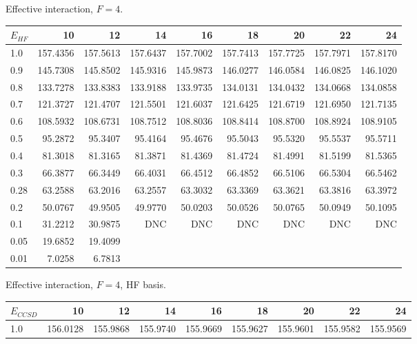 \begin{landscape}
\begin{table}
\begin{center}
Effective interaction, $F=4$.\\
\begin{tabular}{l|rrrrrrrr}
\hline 
$E_{HF}$ & 10 & 12 & 14 & 16 & 18 & 20 & 22 & 24 \\
\hline \hline
1.0 &  157.4356 & 157.5613 & 157.6437 & 157.7002 & 157.7413 & 157.7725 & 157.7971 & 157.8170 \\ 
0.9 &  145.7308 & 145.8502 & 145.9316 & 145.9873 & 146.0277 & 146.0584 & 146.0825 & 146.1020 \\ 
0.8 &  133.7278 & 133.8383 & 133.9188 & 133.9735 & 134.0131 & 134.0432 & 134.0668 & 134.0858 \\ 
0.7 &  121.3727 & 121.4707 & 121.5501 & 121.6037 & 121.6425 & 121.6719 & 121.6950 & 121.7135 \\ 
0.6 &  108.5932 & 108.6731 & 108.7512 & 108.8036 & 108.8414 & 108.8700 & 108.8924 & 108.9105 \\ 
0.5 &   95.2872 &  95.3407 &  95.4164 &  95.4676 &  95.5043 &  95.5320 &  95.5537 &  95.5711 \\ 
0.4 &   81.3018 &  81.3165 &  81.3871 &  81.4369 &  81.4724 &  81.4991 &  81.5199 &  81.5365 \\ 
0.3 &   66.3877 &  66.3449 &  66.4031 &  66.4512 &  66.4852 &  66.5106 &  66.5304 &  66.5462 \\ 
0.28 &  63.2588 &  63.2016 &  63.2557 &  63.3032 &  63.3369 &  63.3621 &  63.3816 &  63.3972 \\ 
0.2 &   50.0767 &  49.9505 &  49.9770 &  50.0203 &  50.0526 &  50.0765 &  50.0949 &  50.1095 \\ 
0.1 &   31.2212 &  30.9875 &      DNC &      DNC &      DNC &      DNC &      DNC &      DNC \\ 
0.05 &  19.6852 &  19.4099  \\ 
0.01 &   7.0258 &   6.7813  \\ 
\hline \hline
\end{tabular}
\end{center}
\begin{center}
Effective interaction, $F=4$, HF basis.\\
\begin{tabular}{l|rrrrrrrr}
\hline 
$E_{CCSD}$ & 10 & 12 & 14 & 16 & 18 & 20 & 22 & 24 \\
\hline \hline
1.0 &  156.0128 & 155.9868 & 155.9740 & 155.9669 & 155.9627 & 155.9601 & 155.9582 & 155.9569 \\ 

\end{tabular}
\end{center}
\end{table}
\end{landscape}
